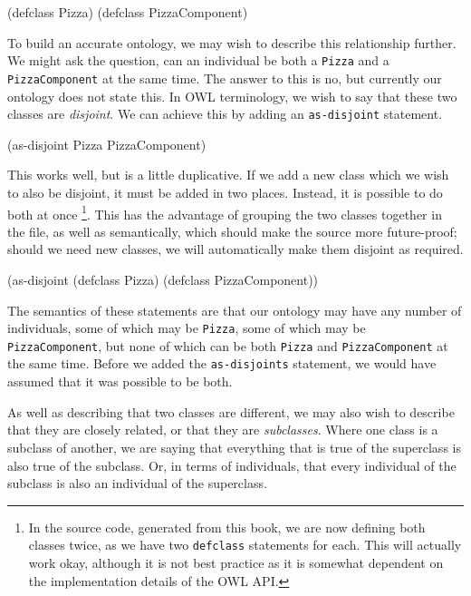 \documentclass[11pt]{article}
\begin{document}
\begin{tawny}
(defclass Pizza)
(defclass PizzaComponent)
\end{tawny}

To build an accurate ontology, we may wish to describe this relationship
further. We might ask the question, can an individual be both a \verb~Pizza~
and a \verb~PizzaComponent~ at the same time. The answer to this is no, but
currently our ontology does not state this. In OWL terminology, we wish
to say that these two classes are \emph{disjoint}. We can achieve this by
adding an \verb~as-disjoint~ statement.

\begin{tawny}
(as-disjoint Pizza PizzaComponent)
\end{tawny}

This works well, but is a little duplicative. If we add a new class
which we wish to also be disjoint, it must be added in two places.
Instead, it is possible to do both at once \footnote{In the source code,
generated from this book, we are now defining both classes twice, as we
have two \verb~defclass~ statements for each. This will actually work okay,
although it is not best practice as it is somewhat dependent on the
implementation details of the OWL API.}. This has the advantage of
grouping the two classes together in the file, as well as semantically,
which should make the source more future-proof; should we need new
classes, we will automatically make them disjoint as required.

\begin{tawny}
(as-disjoint
 (defclass Pizza)
 (defclass PizzaComponent))
\end{tawny}

The semantics of these statements are that our ontology may have any
number of individuals, some of which may be \verb~Pizza~, some of which may
be \verb~PizzaComponent~, but none of which can be both \verb~Pizza~ and
\verb~PizzaComponent~ at the same time. Before we added the \verb~as-disjoints~
statement, we would have assumed that it was possible to be both.

As well as describing that two classes are different, we may also wish
to describe that they are closely related, or that they are
\emph{subclasses}. Where one class is a subclass of another, we are saying
that everything that is true of the superclass is also true of the
subclass. Or, in terms of individuals, that every individual of the
subclass is also an individual of the superclass.
\end{document}

